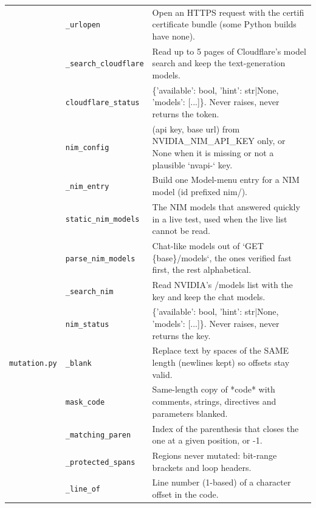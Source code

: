 \begin{longtable}{@{}p{2.8cm}>{\raggedright\arraybackslash}p{4.6cm}p{7.9cm}@{}}
{\small } & \texttt{\small \_\allowbreak{}urlopen} & Open an HTTPS request with the certifi certificate bundle (some Python builds have none). \\
{\small } & \texttt{\small \_\allowbreak{}search\_\allowbreak{}cloudflare} & Read up to 5 pages of Cloudflare's model search and keep the text-generation models. \\
{\small } & \texttt{\small cloudflare\_\allowbreak{}status} & \{'available': bool, 'hint': str|None, 'models': [...]\}. Never raises, never returns the token. \\
{\small } & \texttt{\small nim\_\allowbreak{}config} & (api key, base url) from NVIDIA\_NIM\_API\_KEY only, or None when it is missing or not a plausible `nvapi-` key. \\
{\small } & \texttt{\small \_\allowbreak{}nim\_\allowbreak{}entry} & Build one Model-menu entry for a NIM model (id prefixed nim/). \\
{\small } & \texttt{\small static\_\allowbreak{}nim\_\allowbreak{}models} & The NIM models that answered quickly in a live test, used when the live list cannot be read. \\
{\small } & \texttt{\small parse\_\allowbreak{}nim\_\allowbreak{}models} & Chat-like models out of `GET \{base\}/models`, the ones verified fast first, the rest alphabetical. \\
{\small } & \texttt{\small \_\allowbreak{}search\_\allowbreak{}nim} & Read NVIDIA's /models list with the key and keep the chat models. \\
{\small } & \texttt{\small nim\_\allowbreak{}status} & \{'available': bool, 'hint': str|None, 'models': [...]\}. Never raises, never returns the key. \\
{\small \nolinkurl{mutation.py}} & \texttt{\small \_\allowbreak{}blank} & Replace text by spaces of the SAME length (newlines kept) so offsets stay valid. \\
{\small } & \texttt{\small mask\_\allowbreak{}code} & Same-length copy of *code* with comments, strings, directives and parameters blanked. \\
{\small } & \texttt{\small \_\allowbreak{}matching\_\allowbreak{}paren} & Index of the parenthesis that closes the one at a given position, or -1. \\
{\small } & \texttt{\small \_\allowbreak{}protected\_\allowbreak{}spans} & Regions never mutated: bit-range brackets and loop headers. \\
{\small } & \texttt{\small \_\allowbreak{}line\_\allowbreak{}of} & Line number (1-based) of a character offset in the code. \\

\end{longtable}
